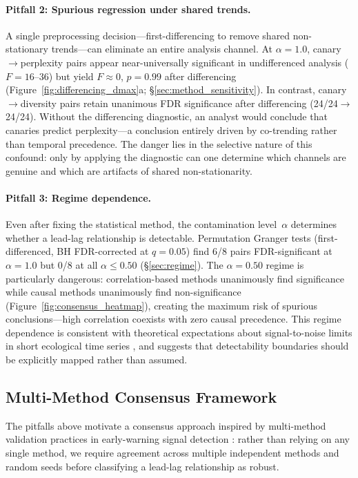 \paragraph{Pitfall 2: Spurious regression under shared trends.}
A single preprocessing decision---first-differencing to remove shared non-stationary trends---can eliminate an entire analysis channel.
At $\alpha{=}1.0$, canary$\to$perplexity pairs appear near-universally significant in undifferenced analysis ($F{=}16$--$36$) but yield $F{\approx}0$, $p{=}0.99$ after differencing (Figure~\ref{fig:differencing_dmax}a; \S\ref{sec:method_sensitivity}).
In contrast, canary$\to$diversity pairs retain unanimous FDR significance after differencing (24/24$\to$24/24).
Without the differencing diagnostic, an analyst would conclude that canaries predict perplexity---a conclusion entirely driven by co-trending rather than temporal precedence.
The danger lies in the selective nature of this confound: only by applying the diagnostic can one determine which channels are genuine and which are artifacts of shared non-stationarity.

\paragraph{Pitfall 3: Regime dependence.}
Even after fixing the statistical method, the contamination level~$\alpha$ determines whether a lead-lag relationship is detectable.
Permutation Granger tests (first-differenced, BH FDR-corrected at $q{=}0.05$) find 6/8 pairs FDR-significant at $\alpha{=}1.0$ but 0/8 at all $\alpha{\leq}0.50$ (\S\ref{sec:regime}).
The $\alpha{=}0.50$ regime is particularly dangerous: correlation-based methods unanimously find significance while causal methods unanimously find non-significance (Figure~\ref{fig:consensus_heatmap}), creating the maximum risk of spurious conclusions---high correlation coexists with zero causal precedence.
This regime dependence is consistent with theoretical expectations about signal-to-noise limits in short ecological time series \cite{boettiger2012limits}, and suggests that detectability boundaries should be explicitly mapped rather than assumed.


\subsection{Multi-Method Consensus Framework}
\label{sec:consensus}

The pitfalls above motivate a consensus approach inspired by multi-method validation practices in early-warning signal detection \cite{scheffer2009early}: rather than relying on any single method, we require agreement across multiple independent methods and random seeds before classifying a lead-lag relationship as robust.

